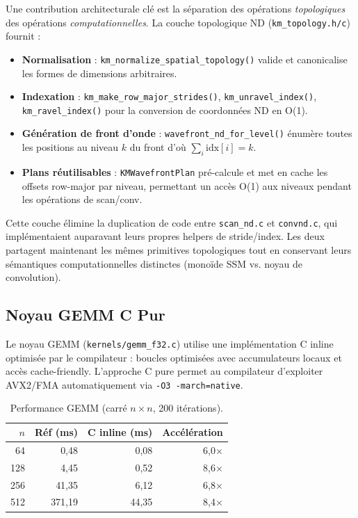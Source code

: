 \documentclass[10pt,onecolumn]{article}
\begin{document}
Une contribution architecturale clé est la séparation des opérations
\emph{topologiques} des opérations \emph{computationnelles}. La couche
topologique ND (\texttt{km\_topology.h/c}) fournit :

\begin{itemize}
  \item \textbf{Normalisation} : \texttt{km\_normalize\_spatial\_topology()} valide et
canonicalise les formes de dimensions arbitraires.
  \item \textbf{Indexation} : \texttt{km\_make\_row\_major\_strides()},
\texttt{km\_unravel\_index()}, \texttt{km\_ravel\_index()} pour la conversion de
coordonnées ND en O(1).
  \item \textbf{Génération de front d'onde} : \texttt{wavefront\_nd\_for\_level()}
énumère toutes les positions au niveau $k$ du front d'où $\sum_i \text{idx}[i] = k$.
  \item \textbf{Plans réutilisables} : \texttt{KMWavefrontPlan} pré-calcule et met
en cache les offsets row-major par niveau, permettant un accès O(1) aux niveaux
pendant les opérations de scan/conv.
\end{itemize}

Cette couche élimine la duplication de code entre \texttt{scan\_nd.c} et
\texttt{convnd.c}, qui implémentaient auparavant leurs propres helpers de
stride/index. Les deux partagent maintenant les mêmes primitives topologiques
tout en conservant leurs sémantiques computationnelles distinctes (monoïde SSM
vs.
noyau de convolution).

\subsection{Noyau GEMM C Pur}

Le noyau GEMM (\texttt{kernels/gemm\_f32.c}) utilise une implémentation C inline
optimisée par le compilateur : boucles optimisées avec accumulateurs locaux
et accès cache-friendly. L'approche C pure permet au compilateur d'exploiter
AVX2/FMA automatiquement via \texttt{-O3 -march=native}.

\begin{table}[htbp]
\centering
\caption{Performance GEMM (carré $n \times n$, 200 itérations).}
\label{tab:gemm}
\begin{tabular}{rrrr}
\toprule
$n$ & Réf (ms) & C inline (ms) & Accélération \\
\midrule
 64 & 0,48 & 0,08 & 6,0× \\
128 & 4,45 & 0,52 & 8,6× \\
256 & 41,35 & 6,12 & 6,8× \\
512 & 371,19 & 44,35 & 8,4× \\
\bottomrule
\end{tabular}
\end{table}
\end{document}
